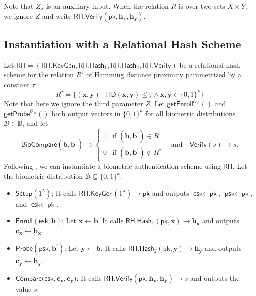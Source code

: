 \noindent Note that $Z_\lambda$ is an auxiliary input. When the relation $R$ is over two sets $X \times Y$, we ignore $Z$ and write $\textsf{RH.Verify}(\textsf{pk}, \mathbf{h_x}, \mathbf{h_y})$.


\subsection{Instantiation with a Relational Hash Scheme}
\label{sec:rh-instantiation}

Let $\textsf{RH} = (\textsf{RH.KeyGen}, \textsf{RH.Hash}_1, \textsf{RH.Hash}_2, \textsf{RH.Verify})$ be a relational hash scheme for the relation $R^\tau$ of Hamming distance proximity parametrized by a constant $\tau$.
\[
	R^\tau = \{ (\mathbf{x}, \mathbf{y}) \mid \textsf{HD}(\mathbf{x}, \mathbf{y}) \leq \tau \wedge \mathbf{x}, \mathbf{y} \in \{0,1\}^k \}
\]
Note that here we ignore the third parameter $Z$.
Let $\textsf{getEnroll}^{\mathcal{O}_{\mathcal{B}}}()$ and $\textsf{getProbe}^{\mathcal{O}_{\mathcal{B}}}()$ both output vectors in $ \{0, 1\}^k$ for all biometric distributions $\mathcal{B} \in \mathbb{B}$, and let 
\[
	\textsf{BioCompare}(\mathbf{b}, \mathbf{b}^\prime) \to
	\begin{cases}
		1 & \text{if } (\mathbf{b}, \mathbf{b}^\prime) \in R^\tau \\
		0 & \text{if } (\mathbf{b}, \mathbf{b}^\prime) \notin R^\tau
	\end{cases} \quad \text{and} \quad
	\textsf{Verify}(s) \to s.
\]
Following \cite{cryptoeprint:2014/394}, we can instantiate a biometric authentication scheme using $\textsf{RH}$.  Let the biometric distribution $\mathcal{B} \subseteq \{0,1\}^k$.

\begin{itemize}

	\item $\textsf{Setup}(1^\lambda)$: It calls $\textsf{RH.KeyGen}(1^\lambda) \to \textsf{pk}$ and outputs $\textsf{esk} \gets \textsf{pk}$, $\textsf{psk} \gets \textsf{pk}$, and $\textsf{csk} \gets \textsf{pk}$.

	\item $\textsf{Enroll}(\textsf{esk}, \mathbf{b})$: Let $\mathbf{x} \gets \mathbf{b}$. It calls $\textsf{RH.Hash}_1(\textsf{pk}, \mathbf{x}) \to \mathbf{h_x}$ and outputs $\mathbf{c_x} \gets \mathbf{h_x}$.

	\item $\textsf{Probe}(\textsf{psk}, \mathbf{b}^\prime)$: Let $\mathbf{y} \gets \mathbf{b}$. It calls $\textsf{RH.Hash}_2(\textsf{pk}, \mathbf{y}) \to \mathbf{h_y}$ and outputs $\mathbf{c_y} \gets \mathbf{h_y}$.

	\item $\textsf{Compare}(\textsf{csk}, \mathbf{c_x}, \mathbf{c_y)}$: It calls $\textsf{RH.Verify}(\textsf{pk}, \mathbf{h_x}, \mathbf{h_y}) \to s$ and outputs the value $s$.

\end{itemize}


